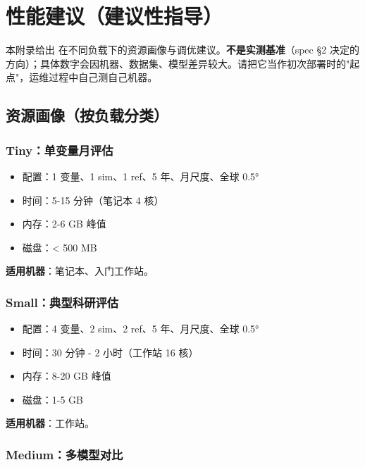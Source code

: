 
\chapter{性能建议（建议性指导）}

本附录给出 \openbench{} 在不同负载下的资源画像与调优建议。\textbf{不是实测基准}（spec §2 决定的方向）；具体数字会因机器、数据集、模型差异较大。请把它当作初次部署时的"起点"，运维过程中自己测自己机器。

\section{资源画像（按负载分类）}

\subsection{Tiny：单变量月评估}

\begin{itemize}
  \item 配置：1 变量、1 sim、1 ref、5 年、月尺度、全球 0.5°
  \item 时间：5-15 分钟（笔记本 4 核）
  \item 内存：2-6 GB 峰值
  \item 磁盘：< 500 MB
\end{itemize}

\textbf{适用机器}：笔记本、入门工作站。

\subsection{Small：典型科研评估}

\begin{itemize}
  \item 配置：4 变量、2 sim、2 ref、5 年、月尺度、全球 0.5°
  \item 时间：30 分钟 - 2 小时（工作站 16 核）
  \item 内存：8-20 GB 峰值
  \item 磁盘：1-5 GB
\end{itemize}

\textbf{适用机器}：工作站。

\subsection{Medium：多模型对比}

